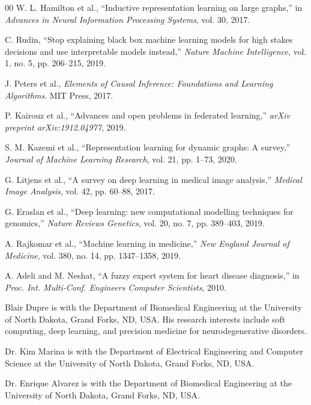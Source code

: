 \documentclass[journal,twoside,web]{ieeecolor}
\begin{document}
\begin{thebibliography}{00}
W. L. Hamilton et al., ``Inductive representation learning on large graphs,'' in \textit{Advances in Neural Information Processing Systems}, vol. 30, 2017.

C. Rudin, ``Stop explaining black box machine learning models for high stakes decisions and use interpretable models instead,'' \textit{Nature Machine Intelligence}, vol. 1, no. 5, pp. 206--215, 2019.

J. Peters et al., \textit{Elements of Causal Inference: Foundations and Learning Algorithms}. MIT Press, 2017.

P. Kairouz et al., ``Advances and open problems in federated learning,'' \textit{arXiv preprint arXiv:1912.04977}, 2019.

S. M. Kazemi et al., ``Representation learning for dynamic graphs: A survey,'' \textit{Journal of Machine Learning Research}, vol. 21, pp. 1--73, 2020.

G. Litjens et al., ``A survey on deep learning in medical image analysis,'' \textit{Medical Image Analysis}, vol. 42, pp. 60--88, 2017.

G. Eraslan et al., ``Deep learning: new computational modelling techniques for genomics,'' \textit{Nature Reviews Genetics}, vol. 20, no. 7, pp. 389--403, 2019.

A. Rajkomar et al., ``Machine learning in medicine,'' \textit{New England Journal of Medicine}, vol. 380, no. 14, pp. 1347--1358, 2019.

A. Adeli and M. Neshat, ``A fuzzy expert system for heart disease diagnosis,'' in \textit{Proc. Int. Multi-Conf. Engineers Computer Scientists}, 2010.

\end{thebibliography}

\begin{IEEEbiographynophoto}{Blair Dupre}
is with the Department of Biomedical Engineering at the University of North Dakota, Grand Forks, ND, USA. His research interests include soft computing, deep learning, and precision medicine for neurodegenerative disorders.
\end{IEEEbiographynophoto}

\begin{IEEEbiographynophoto}{Dr. Kim Marina}
is with the Department of Electrical Engineering and Computer Science at the University of North Dakota, Grand Forks, ND, USA.
\end{IEEEbiographynophoto}

\begin{IEEEbiographynophoto}{Dr. Enrique Alvarez}
is with the Department of Biomedical Engineering at the University of North Dakota, Grand Forks, ND, USA.
\end{IEEEbiographynophoto}
\end{document}
